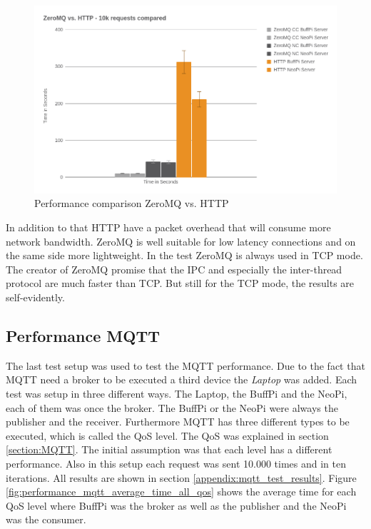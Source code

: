 \begin{figure}[H]
    \centering
    \includegraphics[width=\textwidth]{resources/images/performance_zeromq_vs_http.png}
    \caption[Performance comparison ZeroMQ vs. HTTP]{Performance comparison ZeroMQ vs. HTTP}
    \label{fig:performance_zeromq_vs_http}
\end{figure}

In addition to that \ac{HTTP} have a packet overhead that will consume more network bandwidth.
ZeroMQ is well suitable for low latency connections and on the same side more lightweight.
In the test ZeroMQ is always used in \ac{TCP} mode.
The creator of ZeroMQ promise that the \ac{IPC} and especially the inter-thread protocol are much faster than \ac{TCP}.\autocite[cf.]{ZeroMQ:UicastTransports}
But still for the \ac{TCP} mode, the results are self-evidently.


\subsection{Performance MQTT}
The last test setup was used to test the MQTT performance.
Due to the fact that MQTT need a broker to be executed a third device the \textit{Laptop} was added.
Each test was setup in three different ways.
The Laptop, the BuffPi and the NeoPi, each of them was once the broker.
The BuffPi or the NeoPi were always the publisher and the receiver.
Furthermore MQTT has three different types to be executed, which is called the \ac{QoS} level.
The \ac{QoS} was explained in section \ref{section:MQTT}.
The initial assumption was that each level has a different performance.
Also in this setup each request was sent 10.000 times and in ten iterations.
All results are shown in section \ref{appendix:mqtt_test_results}.
Figure \ref{fig:performance_mqtt_average_time_all_qos} shows the average time for each \ac{QoS} level where BuffPi was the broker as well as the publisher and the NeoPi was the consumer.

